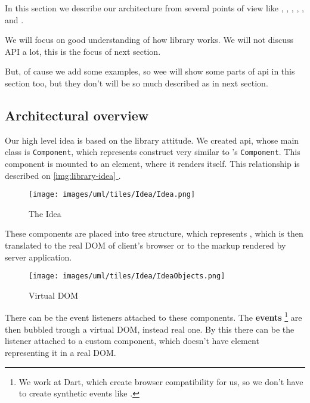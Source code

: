 \documentclass[oneside, 12pt]{book}
\newcommand*{\fullref}[1]{\hyperref[{#1}]{\autoref*{#1} \nameref*{#1}}}
\begin{document}
  In this section we describe our architecture from several points of view like 
  , 
  , 
  , 
  , 
  , 
   and
  .

  We will focus on good understanding of how library works. 
  We will not discuss API a lot, this is the focus of next section. 

  But, of cause we add some examples, so wee will show some parts of api in this section too, 
  but they don't will be so much described as in next section.

  \subsection{Architectural overview}\label{subsec:our-architecture-overview}
    Our high level idea is based on the \facebook \react library attitude. 
    We created api, whose main class is \texttt{Component}, which represents construct very similar to \react's \texttt{Component}.
    This component is mounted to an element, where it renders itself. 
    This relationship is described on \fullref{img:library-idea}.
    \begin{figure}[h]
    \centering  
      \texttt{[image: images/uml/tiles/Idea/Idea.png]}
      \caption{The Idea}
      \label{img:library-idea}
    \end{figure}

    These components are placed into tree structure, which represents \mbox{\textbf{}}, 
    which is then translated to the real DOM of client's browser or to the markup rendered by server application.

    \begin{figure}[h]
    \centering  
      \texttt{[image: images/uml/tiles/Idea/IdeaObjects.png]}
      \caption{Virtual DOM}
      \label{img:library-idea-virtual-dom}
    \end{figure}
    There can be the event listeners attached to these components. 
    The \textbf{events} 
    \footnote{We work at Dart, which create browser compatibility for us, so we don't have to create synthetic events like \react.}
    are then bubbled trough a virtual DOM, instead real one.
    By this there can be the listener attached to a custom component, which doesn't have element representing it in a real DOM.
\end{document}
